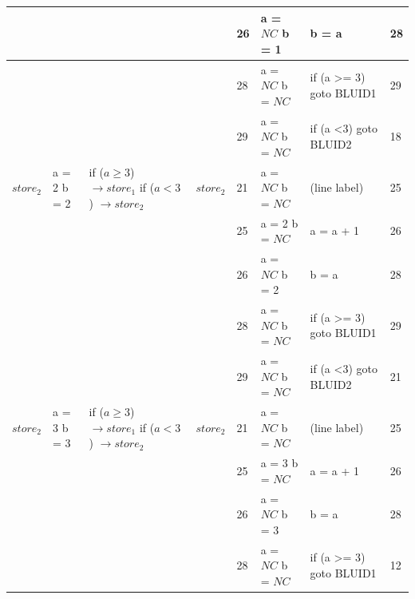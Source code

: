 \begin{table}[htcb]
\begin{tabular}{| p{} | p{} | p{} | p{} | p{} | p{} | p{} | p{} |}
			\hline
								&								&								&						&	26					&	a = $NC$ \newline b = 1		&		b = a					&	28	\\
			\hline
								&								&								&						&	28					&	a = $NC$ \newline b = $NC$	& if (a \textgreater= 3) goto BLUID1 		&	29	\\
			\hline
								&								&								&						&	29					&	a = $NC$ \newline b = $NC$	& if (a \textless 3) goto BLUID2		&	18	\\
			\hline
			$store_2$			&	a = 2	\newline b = 2		&	if ($a \geq 3$) $\rightarrow store_1$ \newline
																	if ($a < 3$) $\rightarrow store_2$ &	$store_2$	&	21					&	a = $NC$ \newline b = $NC$	&	(line label)				&	25	\\
			\hline
								&								&								&						&	25					&	a = 2	\newline b = $NC$	&	a = a + 1					&	26	\\
			\hline
								&								&								&						&	26					&	a = $NC$ \newline b = 2		&	b = a						&	28	\\
			\hline
								&								&								&						&	28					&	a = $NC$ \newline b = $NC$	& if (a \textgreater= 3) goto BLUID1		&	29	\\
			\hline
								&								&								&						&	29					&	a = $NC$ \newline b = $NC$	& if (a \textless 3) goto BLUID2		&	21	\\
			\hline
			$store_2$			&	a = 3	\newline b = 3		&	if ($a \geq 3$) $\rightarrow store_1$ \newline
																	if ($a < 3$) $\rightarrow store_2$ &	$store_2$	&	21					&	a = $NC$ \newline b = $NC$	&	(line label)				&	25	\\
			\hline
								&								&								&						&	25					&	a = 3	\newline b = $NC$	&	a = a + 1					&	26	\\
			\hline
								&								&								&						&	26					&	a = $NC$ \newline b = 3		&	b = a						&	28	\\
			\hline
								&								&								&						&	28					&	a = $NC$ \newline b = $NC$	& if (a \textgreater= 3) goto BLUID1		&	12	\\

\end{tabular}
\end{table}
